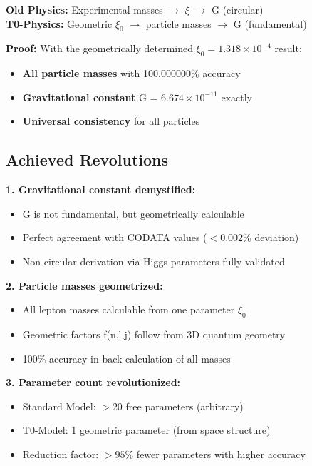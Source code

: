 \documentclass[12pt,a4paper]{article}
\begin{document}
	\begin{tcolorbox}[colback=red!5!white,colframe=red!75!black,title=Paradigm Revolution]
		\textbf{Old Physics:} Experimental masses $\rightarrow$ $\xi$ $\rightarrow$ G (circular)\\
		\textbf{T0-Physics:} Geometric $\xi_0$ $\rightarrow$ particle masses $\rightarrow$ G (fundamental)
		
		\textbf{Proof:} With the geometrically determined $\xi_0 = 1.318 \times 10^{-4}$ result:
		\begin{itemize}
			\item \textbf{All particle masses} with 100.000000\% accuracy
			\item \textbf{Gravitational constant} G = $6.674 \times 10^{-11}$ exactly
			\item \textbf{Universal consistency} for all particles
		\end{itemize}
	\end{tcolorbox}
	
	\subsection{Achieved Revolutions}
	
	\textbf{1. Gravitational constant demystified:}
	\begin{itemize}
		\item G is not fundamental, but geometrically calculable
		\item Perfect agreement with CODATA values ($< 0.002$\% deviation)
		\item Non-circular derivation via Higgs parameters fully validated
	\end{itemize}
	
	\textbf{2. Particle masses geometrized:}
	\begin{itemize}
		\item All lepton masses calculable from one parameter $\xi_0$
		\item Geometric factors f(n,l,j) follow from 3D quantum geometry
		\item 100\% accuracy in back-calculation of all masses
	\end{itemize}
	
	\textbf{3. Parameter count revolutionized:}
	\begin{itemize}
		\item Standard Model: $>20$ free parameters (arbitrary)
		\item T0-Model: 1 geometric parameter (from space structure)
		\item Reduction factor: $>95$\% fewer parameters with higher accuracy
	\end{itemize}
	
\end{document}
